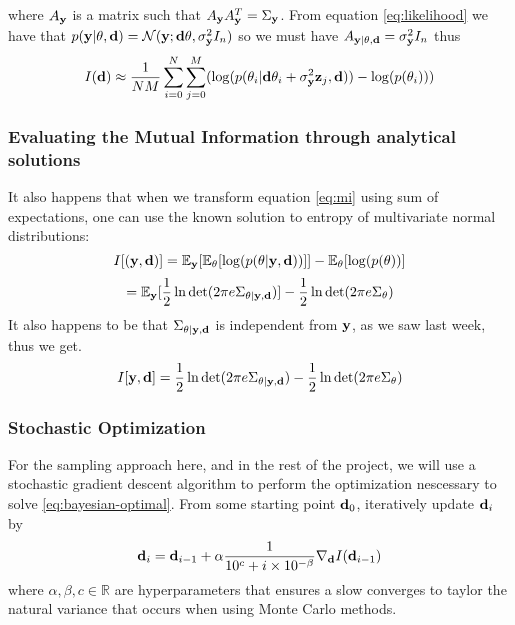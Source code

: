 where $A_{\mathbf{y}}$ is a matrix such that $A_{\mathbf{y}}A_{\mathbf{y}}^T = \Sigma_{\mathbf{y}}$. 
From equation \ref{eq:likelihood} we have that $p(\mathbf{y}| \theta, \mathbf{d}) = \mathcal{N}(\mathbf{y}; \mathbf{d}\theta, \sigma^2_{\mathbf{y}}I_n)$ so we must have $A_{\mathbf{y}|\theta, \mathbf{d}} = \sigma^2_{\mathbf{y}}I_n$
thus  
\begin{equation}
  \label{eq:mi-sampled}
  I(\mathbf{d}) \approx \frac{1}{NM}\sum_{i=0}^N\sum_{j=0}^M(\log (p(\theta_i | \mathbf{d} \theta_i + \sigma^2_{\mathbf{y}}\mathbf{z}_j, \mathbf{d})) - \log(p(\theta_i)))
\end{equation}

\subsubsection{Evaluating the Mutual Information through analytical solutions}
It also happens that when we transform equation \ref{eq:mi} using sum of expectations, one can use the known solution to entropy of multivariate normal distributions:
\begin{equation} I[(\mathbf{y}, \mathbf{d})]  = \mathbb{E}_{\mathbf{y}}[\mathbb{E}_\theta [\log(p(\theta | \mathbf{y}, \mathbf{d}))]] - \mathbb{E}_\theta[\log(p(\theta))]\end{equation}
$$= \mathbb{E}_{\mathbf{y}}[\frac{1}{2}\ln \det (2\pi e \Sigma_{\theta|\mathbf{y,d}})] - \frac{1}{2}\ln \det (2\pi e\Sigma_\theta)$$
It also happens to be that $\Sigma_{\theta|\mathbf{y,d}}$ is independent from $\mathbf{y}$, as we saw last week, thus we get.
\begin{equation} I[\mathbf{y}, \mathbf{d}]  = \frac{1}{2}\ln \det (2\pi e \Sigma_{\theta|\mathbf{y,d}}) - \frac{1}{2}\ln \det (2\pi e\Sigma_\theta)\end{equation}

\subsubsection{Stochastic Optimization}
For the sampling approach here, and in the rest of the project, we will use a stochastic gradient descent algorithm to perform the optimization nescessary to solve \ref{eq:bayesian-optimal}.
From some starting point $\mathbf{d}_0$, iteratively update $\mathbf{d}_i$ by
\begin{equation}
  \mathbf{d}_i = \mathbf{d}_{i-1} + \alpha \frac{1}{10^c + i \times 10^{-\beta}} \nabla_{\mathbf{d}} I(\mathbf{d}_{i-1})
\end{equation}
where $\alpha, \beta, c \in \mathbb{R}$ are hyperparameters that ensures a slow converges to taylor the natural variance that occurs when using Monte Carlo methods.

